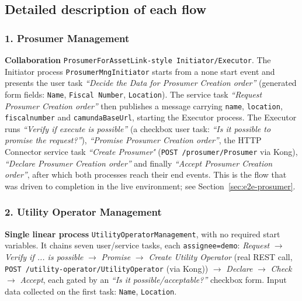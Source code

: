 \documentclass[11pt,a4paper]{article}
\begin{document}
\subsection{Detailed description of each flow}
 
\subsubsection*{1. Prosumer Management}
\textbf{Collaboration} \texttt{ProsumerForAssetLink-style Initiator/Executor}.
The Initiator process \texttt{ProsumerMngInitiator} starts from a none start
event and presents the user task \emph{``Decide the Data for Prosumer Creation
order''} (generated form fields: \texttt{Name}, \texttt{Fiscal Number},
\texttt{Location}). The service task \emph{``Request Prosumer Creation
order''} then publishes a message carrying \texttt{name}, \texttt{location},
\texttt{fiscalnumber} and \texttt{camundaBaseUrl}, starting the Executor
process. The Executor runs \emph{``Verify if execute is possible''} (a
checkbox user task: \emph{``Is it possible to promise the request?''}),
\emph{``Promise Prosumer Creation order''}, the HTTP Connector service task \emph{``Create Prosumer\'\'} (\texttt{POST /prosumer/Prosumer} via Kong), \emph{``Declare Prosumer Creation
order''} and finally \emph{``Accept Prosumer Creation order''}, after which
both processes reach their end events. This is the flow that was driven to
completion in the live environment; see Section~\ref{sec:e2e-prosumer}.
 
\subsubsection*{2. Utility Operator Management}
\textbf{Single linear process} \texttt{UtilityOperatorManagement}, with no
required start variables. It chains seven user/service tasks, each
\texttt{assignee=demo}: \emph{Request} $\rightarrow$ \emph{Verify if
... is possible} $\rightarrow$ \emph{Promise} $\rightarrow$ \emph{Create
Utility Operator} (real REST call, \texttt{POST /utility-operator/UtilityOperator} (via Kong)) $\rightarrow$
\emph{Declare} $\rightarrow$ \emph{Check} $\rightarrow$ \emph{Accept}, each
gated by an \emph{``Is it possible/acceptable?''} checkbox form. Input data
collected on the first task: \texttt{Name}, \texttt{Location}.
 
\end{document}

